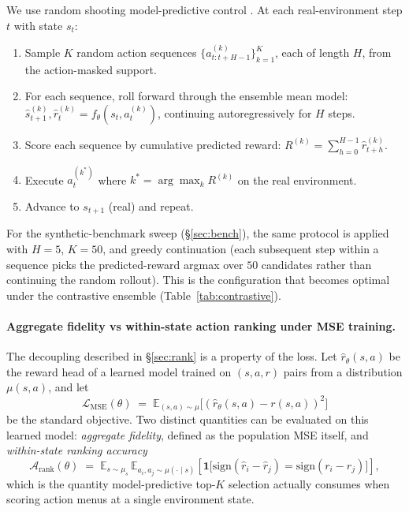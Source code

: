 \documentclass[11pt]{article}
\begin{document}
We use random shooting model-predictive control \citep{garcia1989model,williams2017model,rubinstein1999cross}. At each real-environment step $t$ with state $s_t$:
\begin{enumerate}
\item Sample $K$ random action sequences $\{a^{(k)}_{t:t+H-1}\}_{k=1}^K$, each of length $H$, from the action-masked support.
\item For each sequence, roll forward through the ensemble mean model: $\hat{s}^{(k)}_{t+1}, \hat{r}^{(k)}_t = f_\theta(s_t, a^{(k)}_t)$, continuing autoregressively for $H$ steps.
\item Score each sequence by cumulative predicted reward: $R^{(k)} = \sum_{h=0}^{H-1} \hat{r}^{(k)}_{t+h}$.
\item Execute $a^{(k^*)}_{t}$ where $k^* = \arg\max_k R^{(k)}$ on the real environment.
\item Advance to $s_{t+1}$ (real) and repeat.
\end{enumerate}
For the synthetic-benchmark sweep (\S\ref{sec:bench}), the same protocol is applied with $H{=}5$, $K{=}50$, and greedy continuation (each subsequent step within a sequence picks the predicted-reward argmax over $50$ candidates rather than continuing the random rollout). This is the configuration that becomes optimal under the contrastive ensemble (Table~\ref{tab:contrastive}).

\paragraph{Aggregate fidelity vs within-state action ranking under MSE training.}\label{sec:methods-fidelity-vs-ranking}

The decoupling described in \S\ref{sec:rank} is a property of the loss. Let $\hat{r}_\theta(s, a)$ be the reward head of a learned model trained on $(s, a, r)$ pairs from a distribution $\mu(s, a)$, and let
\begin{equation}
\mathcal{L}_{\text{MSE}}(\theta) \;=\; \mathbb{E}_{(s,a)\sim\mu}\big[(\hat{r}_\theta(s,a) - r(s,a))^2\big]
\end{equation}
be the standard objective. Two distinct quantities can be evaluated on this learned model: \emph{aggregate fidelity}, defined as the population MSE itself, and \emph{within-state ranking accuracy}
\begin{equation}
\mathcal{A}_{\text{rank}}(\theta) \;=\; \mathbb{E}_{s\sim\mu_s}\,\mathbb{E}_{a_i,a_j\sim\mu(\cdot \mid s)}\!\left[\mathbf{1}\big[\mathrm{sign}(\hat{r}_i - \hat{r}_j) = \mathrm{sign}(r_i - r_j)\big]\right],
\end{equation}
which is the quantity model-predictive top-$K$ selection actually consumes when scoring action menus at a single environment state.
\end{document}
